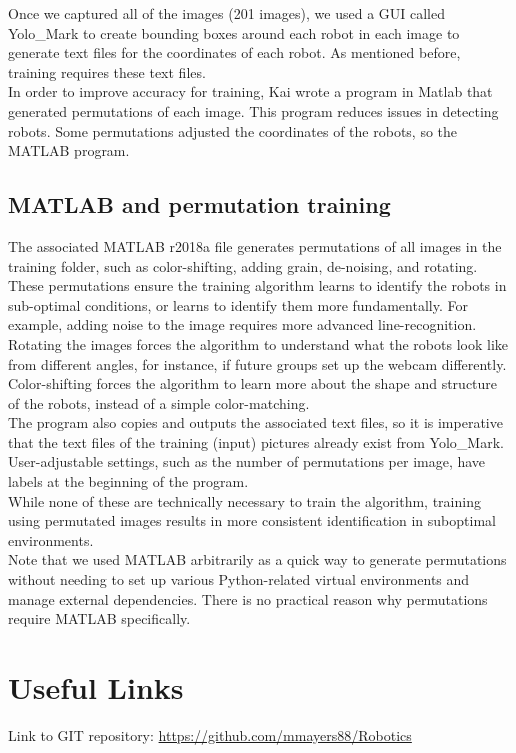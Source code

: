 \documentclass[a4paper,12pt]{article}
\begin{document}
	Once we captured all of the images (201 images), we used a GUI called Yolo\_Mark to create bounding boxes around each robot in each image to generate text files for the coordinates of each robot. As mentioned before, training requires these text files.\\

	In order to improve accuracy for training, Kai wrote a program in Matlab that generated permutations of each image. This program reduces issues in detecting robots. Some permutations adjusted the coordinates of the robots, so the MATLAB program.\\

\subsection{MATLAB and permutation training}
	The associated MATLAB r2018a file generates permutations of all images in the training folder, such as color-shifting, adding grain, de-noising, and rotating. These permutations ensure the training algorithm learns to identify the robots in sub-optimal conditions, or learns to identify them more fundamentally. For example, adding noise to the image requires more advanced line-recognition. Rotating the images forces the algorithm to understand what the robots look like from different angles, for instance, if future groups set up the webcam differently. Color-shifting forces the algorithm to learn more about the shape and structure of the robots, instead of a simple color-matching.\\
	
	The program also copies and outputs the associated text files, so it is imperative that the text files of the training (input) pictures already exist from Yolo\_Mark. User-adjustable settings, such as the number of permutations per image, have labels at the beginning of the program.\\
	
	While none of these are technically necessary to train the algorithm, training using permutated images results in more consistent identification in suboptimal environments.\\
	
	Note that we used MATLAB arbitrarily as a quick way to generate permutations without needing to set up various Python-related virtual environments and manage external dependencies. There is no practical reason why permutations require MATLAB specifically.

\section{Useful Links}
Link to GIT repository: \href{https://github.com/mmayers88/Robotics}{https://github.com/mmayers88/Robotics}\\
\end{document}
